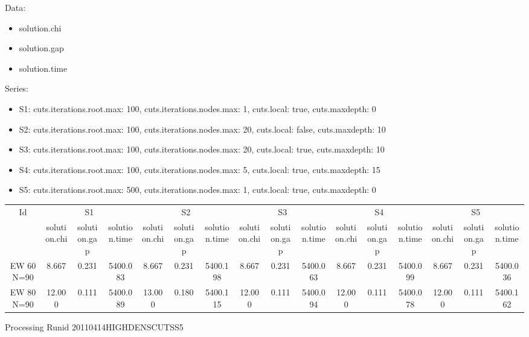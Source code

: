 \documentclass[landscape, 12pt]{report}
\begin{document}
Data:
\begin{itemize}
\item solution.chi
\item solution.gap
\item solution.time
\end{itemize}
Series:
\begin{itemize}
\item S1: cuts.iterations.root.max: 100, cuts.iterations.nodes.max: 1, cuts.local: true, cuts.maxdepth: 0
\item S2: cuts.iterations.root.max: 100, cuts.iterations.nodes.max: 20, cuts.local: false, cuts.maxdepth: 10
\item S3: cuts.iterations.root.max: 100, cuts.iterations.nodes.max: 20, cuts.local: true, cuts.maxdepth: 10
\item S4: cuts.iterations.root.max: 100, cuts.iterations.nodes.max: 5, cuts.local: true, cuts.maxdepth: 15
\item S5: cuts.iterations.root.max: 500, cuts.iterations.nodes.max: 1, cuts.local: true, cuts.maxdepth: 0
\end{itemize}
\begin{tabular}{|c|ccc|ccc|ccc|ccc|ccc|}
\hline
\multicolumn{1}{|c|}{Id} & \multicolumn{3}{|c|}{S1} & \multicolumn{3}{|c|}{S2} & \multicolumn{3}{|c|}{S3} & \multicolumn{3}{|c|}{S4} & \multicolumn{3}{|c|}{S5}
\\
 & solution.chi & solution.gap & solution.time & solution.chi & solution.gap & solution.time & solution.chi & solution.gap & solution.time & solution.chi & solution.gap & solution.time & solution.chi & solution.gap & solution.time
\\
\hline
EW 60 N=90 & 8.667 & 0.231 & 5400.083 & 8.667 & 0.231 & 5400.198 & 8.667 & 0.231 & 5400.063 & 8.667 & 0.231 & 5400.099 & 8.667 & 0.231 & 5400.036
\\
EW 80 N=90 & 12.000 & 0.111 & 5400.089 & 13.000 & 0.180 & 5400.115 & 12.000 & 0.111 & 5400.094 & 12.000 & 0.111 & 5400.078 & 12.000 & 0.111 & 5400.162
\\
\hline 
 \end{tabular}



Processing Runid 20110414HIGHDENSCUTSS5
\end{document}
